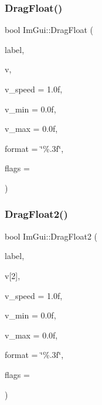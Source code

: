 \mbox{\label{namespaceImGui_aab1b20e7bf98aa7bbdb26f8cd3ad91e6}} 
\subsubsection{\texorpdfstring{Drag\+Float()}{DragFloat()}}
{\footnotesize\ttfamily bool Im\+Gui\+::\+Drag\+Float (\begin{DoxyParamCaption}\item[{const char $\ast$}]{label,  }\item[{float $\ast$}]{v,  }\item[{float}]{v\+\_\+speed = {\ttfamily 1.0f},  }\item[{float}]{v\+\_\+min = {\ttfamily 0.0f},  }\item[{float}]{v\+\_\+max = {\ttfamily 0.0f},  }\item[{const char $\ast$}]{format = {\ttfamily \char`\"{}\%.3f\char`\"{}},  }\item[{Im\+Gui\+Slider\+Flags}]{flags = {} }\end{DoxyParamCaption})}

\mbox{\label{namespaceImGui_afc9ce10d78534a5c186cee0b337f7471}} 
\subsubsection{\texorpdfstring{Drag\+Float2()}{DragFloat2()}}
{\footnotesize\ttfamily bool Im\+Gui\+::\+Drag\+Float2 (\begin{DoxyParamCaption}\item[{const char $\ast$}]{label,  }\item[{float}]{v\mbox{[}2\mbox{]},  }\item[{float}]{v\+\_\+speed = {\ttfamily 1.0f},  }\item[{float}]{v\+\_\+min = {\ttfamily 0.0f},  }\item[{float}]{v\+\_\+max = {\ttfamily 0.0f},  }\item[{const char $\ast$}]{format = {\ttfamily \char`\"{}\%.3f\char`\"{}},  }\item[{Im\+Gui\+Slider\+Flags}]{flags = {} }\end{DoxyParamCaption})}

